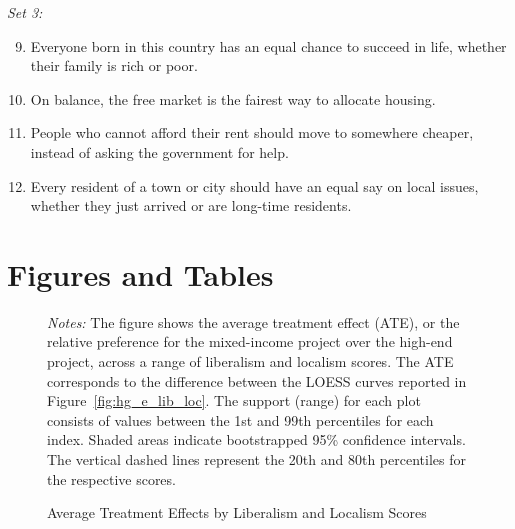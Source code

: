 \documentclass[article,12pt]{memoir}
\begin{document}
\begin{SingleSpacing}
\noindent \emph{Set 3:}
\begin{enumerate}
  \setcounter{enumi}{8}  
  \item Everyone born in this country has an equal chance to succeed in life, whether their family is rich or poor.
  \item On balance, the free market is the fairest way to allocate housing.
  \item People who cannot afford their rent should move to somewhere cheaper, instead of asking the government for help.
  \item Every resident of a town or city should have an equal say on local issues, whether they just arrived or are long-time residents.
\end{enumerate}

\clearpage
\section{Figures and Tables}

\begin{figure}[htb]\centering
  \caption{Average Treatment Effects by Liberalism and Localism Scores}
  \label{fig:hg_e_ate}
  \begin{measuredfigure}
  \end{measuredfigure}
  \begin{tablenotes}[flushleft]
    \item \hspace{-.2em}\emph{Notes:} The figure shows the average treatment effect (ATE), or the relative preference for the mixed-income project over the high-end project, across a range of liberalism and localism scores.  The ATE corresponds to the difference between the LOESS curves reported in Figure~\ref{fig:hg_e_lib_loc}.  The support (range) for each plot consists of values between the 1st and 99th percentiles for each index.  Shaded areas indicate bootstrapped 95\% confidence intervals. The vertical dashed lines represent the 20th and 80th percentiles for the respective scores.
  \end{tablenotes}
\end{figure}


\end{SingleSpacing}
\end{document}
